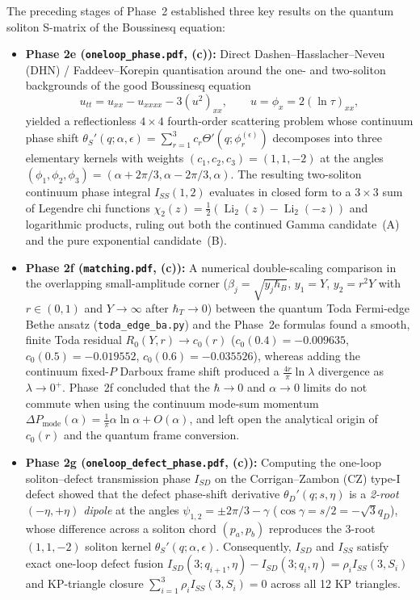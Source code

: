 \documentclass[11pt,a4paper]{article}
\newcommand{\hb}{\hbar}
\newcommand{\Li}{\operatorname{Li}}
\begin{document}
The preceding stages of Phase~2 established three key results on the quantum
soliton S-matrix of the Boussinesq equation:
\begin{itemize}
\item \textbf{Phase 2e (\texttt{oneloop\_phase.pdf}, \textbf{(c)}):}
Direct Dashen--Hasslacher--Neveu (DHN) / Faddeev--Korepin quantisation around the
one- and two-soliton backgrounds of the good Boussinesq equation
\begin{equation}
  u_{tt} = u_{xx} - u_{xxxx} - 3(u^2)_{xx}, \qquad
  u = \phi_x = 2(\ln\tau)_{xx},
  \label{eq:good_bouss}
\end{equation}
yielded a reflectionless $4\times 4$ fourth-order scattering problem whose
continuum phase shift $\theta_S'(q;\alpha,\epsilon) = \sum_{r=1}^3 c_r\Theta'(q;\phi_r^{(\epsilon)})$
decomposes into three elementary kernels with weights $(c_1,c_2,c_3)=(1,1,-2)$ at
the angles $(\phi_1,\phi_2,\phi_3) = (\alpha+2\pi/3,\alpha-2\pi/3,\alpha)$. The
resulting two-soliton continuum phase integral $I_{SS}(1,2)$ evaluates in closed
form to a $3\times 3$ sum of Legendre chi functions $\chi_2(z) = \frac{1}{2}(\Li_2(z)-\Li_2(-z))$
and logarithmic products, ruling out both the continued Gamma candidate~(A) and
the pure exponential candidate~(B).
\item \textbf{Phase 2f (\texttt{matching.pdf}, \textbf{(c)}):}
A numerical double-scaling comparison in the overlapping small-amplitude corner
($\beta_j = \sqrt{y_j\hb_B}$, $y_1 = Y$, $y_2 = r^2 Y$ with $r \in (0,1)$ and
$Y\to\infty$ after $\hb_T\to 0$) between the quantum Toda Fermi-edge Bethe ansatz
(\texttt{toda\_edge\_ba.py}) and the Phase~2e formulas found a smooth, finite
Toda residual $R_0(Y,r) \to c_0(r)$ ($c_0(0.4) = -0.009635$,
$c_0(0.5) = -0.019552$, $c_0(0.6) = -0.035526$), whereas adding the continuum
fixed-$P$ Darboux frame shift produced a $\frac{4r}{\pi}\ln\lambda$ divergence as
$\lambda\to 0^+$. Phase~2f concluded that the $\hb\to 0$ and $\alpha\to 0$ limits
do not commute when using the continuum mode-sum momentum
$\Delta P_{\mathrm{mode}}(\alpha) = \frac{1}{\pi}\alpha\ln\alpha + O(\alpha)$,
and left open the analytical origin of $c_0(r)$ and the quantum frame conversion.
\item \textbf{Phase 2g (\texttt{oneloop\_defect\_phase.pdf}, \textbf{(c)}):}
Computing the one-loop soliton--defect transmission phase $I_{SD}$ on the
Corrigan--Zambon (CZ) type-I defect \cite{CZ2023} showed that the defect
phase-shift derivative $\theta_D'(q;s,\eta)$ is a \emph{2-root $(-\eta,+\eta)$
dipole} at the angles $\psi_{1,2} = \pm 2\pi/3 - \gamma$ ($\cos\gamma = s/2 = -\sqrt{3}q_D$),
whose difference across a soliton chord $(p_a,p_b)$ reproduces the 3-root
$(1,1,-2)$ soliton kernel $\theta_S'(q;\alpha,\epsilon)$. Consequently, $I_{SD}$
and $I_{SS}$ satisfy exact one-loop defect fusion
$I_{SD}(3;q_{i+1},\eta) - I_{SD}(3;q_i,\eta) = \rho_i I_{SS}(3,S_i)$ and
KP-triangle closure $\sum_{i=1}^3 \rho_i I_{SS}(3,S_i) = 0$ across all 12 KP
triangles.
\end{itemize}
\end{document}
